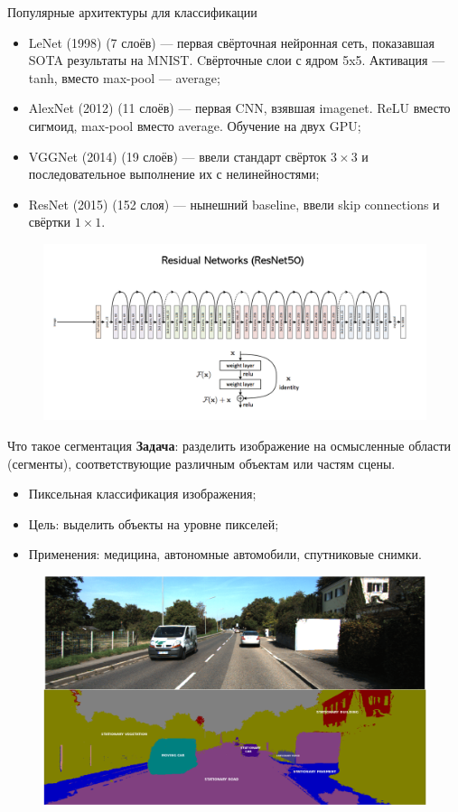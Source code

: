\documentclass[notheorems, handout]{beamer}
\begin{document}
\begin{frame}{Популярные архитектуры для классификации}
    \begin{itemize}
        \item LeNet (1998) (7 слоёв) --- первая свёрточная нейронная сеть, показавшая SOTA результаты на MNIST. Cвёрточные слои с ядром 5x5. Активация --- tanh, вместо max-pool --- average;
        \item AlexNet (2012) (11 слоёв) --- первая CNN, взявшая imagenet. ReLU вместо сигмоид, max-pool вместо average. Обучение на двух GPU;
        \item VGGNet (2014) (19 слоёв) --- ввели стандарт свёрток $3 \times 3$ и последовательное выполнение их с нелинейностями;
        \item ResNet (2015) (152 слоя) --- нынешний baseline, ввели skip connections и свёртки $1 \times 1$.
    \end{itemize}
    \begin{figure}
        \includegraphics[width=\linewidth]{img/resnet.png}    
    \end{figure}
\end{frame}

\begin{frame}{Что такое сегментация}
    \textbf{Задача}: разделить изображение на осмысленные области (сегменты), соответствующие различным объектам или частям сцены.

    \begin{itemize}
        \item Пиксельная классификация изображения;
        \item Цель: выделить объекты на уровне пикселей;
        \item Применения: медицина, автономные автомобили, спутниковые снимки.
    \end{itemize}
    \begin{figure}
        \includegraphics[width=0.8\linewidth]{img/segmentation.png}
    \end{figure}
\end{frame}
\end{document}
